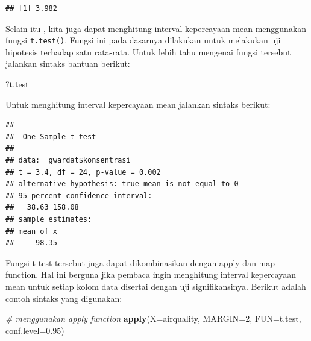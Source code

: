 \documentclass[]{book}
\newenvironment{Shaded}{\begin{snugshade}}{\end{snugshade}}
\newcommand{\KeywordTok}[1]{\textcolor[rgb]{0.13,0.29,0.53}{\textbf{#1}}}
\newcommand{\DataTypeTok}[1]{\textcolor[rgb]{0.13,0.29,0.53}{#1}}
\newcommand{\DecValTok}[1]{\textcolor[rgb]{0.00,0.00,0.81}{#1}}
\newcommand{\FloatTok}[1]{\textcolor[rgb]{0.00,0.00,0.81}{#1}}
\newcommand{\CommentTok}[1]{\textcolor[rgb]{0.56,0.35,0.01}{\textit{#1}}}
\newcommand{\OperatorTok}[1]{\textcolor[rgb]{0.81,0.36,0.00}{\textbf{#1}}}
\newcommand{\NormalTok}[1]{#1}
\begin{document}
\begin{verbatim}
## [1] 3.982
\end{verbatim}

Selain itu , kita juga dapat menghitung interval kepercayaan mean
menggunakan fungsi \texttt{t.test()}. Fungsi ini pada dasarnya dilakukan
untuk melakukan uji hipotesis terhadap satu rata-rata. Untuk lebih tahu
mengenai fungsi tersebut jalankan sintaks bantuan berikut:

\begin{Shaded}
\begin{Highlighting}[]
\NormalTok{?t.test}
\end{Highlighting}
\end{Shaded}

Untuk menghitung interval kepercayaan mean jalankan sintaks berikut:

\begin{Shaded}
\end{Shaded}

\begin{verbatim}
## 
##  One Sample t-test
## 
## data:  gwardat$konsentrasi
## t = 3.4, df = 24, p-value = 0.002
## alternative hypothesis: true mean is not equal to 0
## 95 percent confidence interval:
##   38.63 158.08
## sample estimates:
## mean of x 
##     98.35
\end{verbatim}

Fungsi t-test tersebut juga dapat dikombinasikan dengan apply dan map
function. Hal ini berguna jika pembaca ingin menghitung interval
kepercayaan mean untuk setiap kolom data disertai dengan uji
signifikansinya. Berikut adalah contoh sintaks yang digunakan:

\begin{Shaded}
\begin{Highlighting}[]
\CommentTok{# menggunakan apply function}
\KeywordTok{apply}\NormalTok{(}\DataTypeTok{X=}\NormalTok{airquality, }\DataTypeTok{MARGIN=}\DecValTok{2}\NormalTok{, }\DataTypeTok{FUN=}\NormalTok{t.test, }\DataTypeTok{conf.level=}\FloatTok{0.95}\NormalTok{)}
\end{Highlighting}
\end{Shaded}
\end{document}
